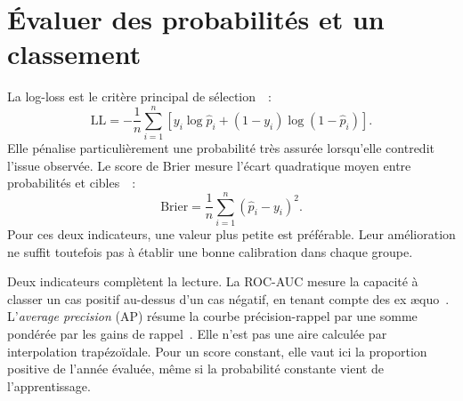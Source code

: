 \section{Évaluer des probabilités et un classement}
La log-loss est le critère principal de sélection~\cite{sklearn-logloss}~:
\[
 \mathrm{LL}=-\frac1n\sum_{i=1}^n
 \left[y_i\log\widehat p_i+(1-y_i)\log(1-\widehat p_i)\right].
\]
Elle pénalise particulièrement une probabilité très assurée lorsqu'elle contredit
l'issue observée. Le score de Brier mesure l'écart quadratique moyen entre probabilités
et cibles~\cite{sklearn-brier}~:
\[
 \mathrm{Brier}=\frac1n\sum_{i=1}^n(\widehat p_i-y_i)^2.
\]
Pour ces deux indicateurs, une valeur plus petite est préférable. Leur amélioration ne
suffit toutefois pas à établir une bonne calibration dans chaque groupe.

Deux indicateurs complètent la lecture. La ROC-AUC mesure la capacité à classer un cas
positif au-dessus d'un cas négatif, en tenant compte des ex æquo~\cite{sklearn-roc}.
L'\textit{average precision} (AP) résume la courbe précision-rappel par une somme
pondérée par les gains de rappel~\cite{sklearn-ap}. Elle n'est pas une aire calculée
par interpolation trapézoïdale. Pour un score constant, elle vaut ici la proportion
positive de l'année évaluée, même si la probabilité constante vient de l'apprentissage.

\FloatBarrier
{}
